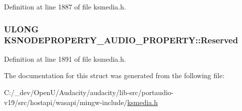 Definition at line 1887 of file ksmedia.\+h.

\subsubsection[{\texorpdfstring{Reserved}{Reserved}}]{\setlength{\rightskip}{0pt plus 5cm}U\+L\+O\+NG K\+S\+N\+O\+D\+E\+P\+R\+O\+P\+E\+R\+T\+Y\+\_\+\+A\+U\+D\+I\+O\+\_\+\+P\+R\+O\+P\+E\+R\+T\+Y\+::\+Reserved}\hypertarget{struct_k_s_n_o_d_e_p_r_o_p_e_r_t_y___a_u_d_i_o___p_r_o_p_e_r_t_y_a0e2897be481c76900e2af254fbd3a909}{}\label{struct_k_s_n_o_d_e_p_r_o_p_e_r_t_y___a_u_d_i_o___p_r_o_p_e_r_t_y_a0e2897be481c76900e2af254fbd3a909}


Definition at line 1891 of file ksmedia.\+h.



The documentation for this struct was generated from the following file\+:\begin{DoxyCompactItemize}
\item 
C\+:/\+\_\+dev/\+Open\+U/\+Audacity/audacity/lib-\/src/portaudio-\/v19/src/hostapi/wasapi/mingw-\/include/\hyperlink{ksmedia_8h}{ksmedia.\+h}\end{DoxyCompactItemize}

